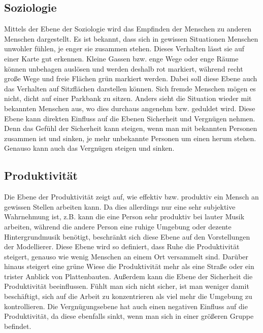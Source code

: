\documentclass[10pt]{scrartcl}
\begin{document}
\subsection{Soziologie}
Mittels der Ebene der Soziologie wird das Empfinden der Menschen zu anderen Menschen dargestellt. Es ist bekannt, dass sich in gewissen Situationen Menschen unwohler fühlen, je enger sie zusammen stehen. Dieses Verhalten lässt sie auf einer Karte gut erkennen. Kleine Gassen bzw. enge Wege oder enge Räume können unbehagen auslösen und werden deshalb rot markiert, während recht große Wege und freie Flächen grün markiert werden.
\newline Dabei soll diese Ebene auch das Verhalten auf Sitzflächen darstellen können. Sich fremde Menschen mögen es nicht, dicht auf einer Parkbank zu sitzen. Anders sieht die Situation wieder mit bekannten Menschen aus, wo dies durchaus angenehm bzw. geduldet wird.
\newline Diese Ebene kann direkten Einfluss auf die Ebenen Sicherheit und Vergnügen nehmen. Denn das Gefühl der Sicherheit kann steigen, wenn man mit bekannten Personen zusammen ist und sinken, je mehr unbekannte Personen um einen herum stehen. Genauso kann auch das Vergnügen steigen und sinken.

\subsection{Produktivität}
Die Ebene der Produktivität zeigt auf, wie effektiv bzw. produktiv ein Mensch an
gewissen Stellen arbeiten kann. Da dies allerdings nur eine sehr subjektive
Wahrnehmung ist,  z.B. kann die eine Person sehr produktiv bei lauter Musik
arbeiten, während die andere Person eine ruhige Umgebung oder dezente
Hintergrundmusik benötigt, beschränkt sich diese Ebene auf den Vorstellungen der
Modellierer. 
\newline Diese Ebene wird so definiert, dass Ruhe die Produktivität
steigert, genauso wie wenig Menschen an einem Ort versammelt sind. Darüber
hinaus steigert eine grüne Wiese die Produktivität mehr als eine Straße
oder ein trister Anblick von Plattenbauten. 
\newline Außerdem kann die Ebene der Sicherheit die Produktivität beeinflussen.
Fühlt man sich nicht sicher, ist man weniger damit beschäftigt, sich auf die
Arbeit zu konzentrieren als viel mehr die Umgebung zu kontrollieren. Die
Vergnügungsebene hat auch einen negativen Einfluss auf die Produktivität, da
diese ebenfalls sinkt, wenn man sich in einer größeren Gruppe befindet. 
\end{document}

